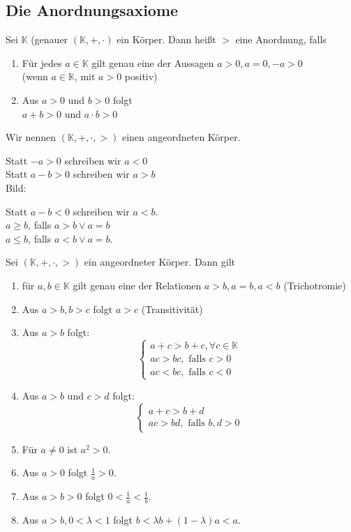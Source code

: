 \documentclass[../ana1.tex]{subfiles}
\begin{document}
\subsection{Die Anordnungsaxiome}
\begin{defi} %
	Sei \(\mathbb{K}\) (genauer \((\mathbb{K},+,\cdot)\) ein Körper. Dann heißt \(>\) eine Anordnung, falls
	\begin{enumerate}
		\item Für jedes \(a\in\mathbb{K}\) gilt genau eine der Aussagen \(a>0,a=0,-a>0\) \\
		      (wenn \(a\in\mathbb{K}\), mit \(a>0\) positiv)
		\item Aus \(a>0\) und \(b>0\) folgt\\
		      \(a+b>0\) und \(a\cdot b>0\)
	\end{enumerate}
	Wir nennen \((\mathbb{K},+,\cdot,>)\) einen angeordneten Körper.
\end{defi}
\begin{bem}
	Statt \(-a>0\) schreiben wir \(a<0\) \\
	Statt \(a-b>0\) schreiben wir \(a>b\) \\
	Bild:
	\begin{center}
	\end{center}
	Statt \(a-b<0\) schreiben wir \(a<b\).\\
	\(a \geq b\), falls \(a>b \vee a=b\) \\
	\(a \leq b\), falls \(a<b \vee a=b\).
\end{bem}
\begin{satz}
	Sei \((\mathbb{K}, +,\cdot, >)\) ein angeordneter Körper. Dann gilt
	\begin{enumerate}
		\item für \(a,b\in\mathbb{K}\) gilt genau eine der Relationen \(a>b, a=b, a<b\) (Trichotromie)
		\item Aus \(a>b, b>c\) folgt \(a>c\) (Transitivität)
		\item Aus \(a>b\) folgt:
			\[\begin{cases}
				a+c>b+c, \forall c\in\mathbb{K} \\
				ac>bc, \text{ falls } c>0       \\
				ac<bc, \text{ falls } c<0
			\end{cases}\]
		\item Aus \(a>b\) und \(c>d\) folgt:\\
			\[\begin{cases}
				a+c>b+d \\
				ac>bd, \text{ falls } b,d>0 %
			\end{cases}\]
		\item Für \(a\neq 0\) ist \(a^2 >0\).
		\item Aus \(a>0\) folgt \(\frac{1}{a}>0\).
		\item Aus \(a>b>0\) folgt \(0<\frac{1}{a}<\frac{1}{b}\).
		\item Aus \(a>b, 0<\lambda<1\) folgt \(b<\lambda b + (1-\lambda)a<a\).
	\end{enumerate}
\end{satz}
\end{document}
